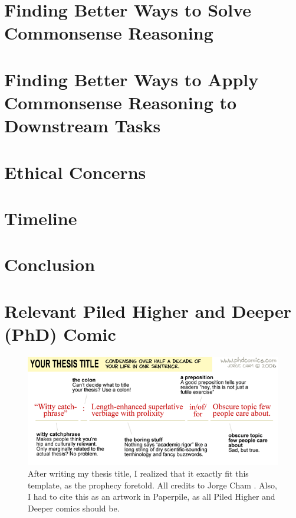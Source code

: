 \documentclass[12pt]{report}
\begin{document}
\newpage
\chapter{Finding Better Ways to Solve Commonsense Reasoning}
\label{chapter:commonsense-reasoning}

\newpage
\chapter{Finding Better Ways to Apply Commonsense Reasoning to Downstream Tasks}

\newpage
\chapter{Ethical Concerns}

\newpage
\chapter{Timeline}


\chapter{Conclusion}

\begin{footnotesize}
    
    
\end{footnotesize}

\appendix

\chapter{Relevant Piled Higher and Deeper (PhD) Comic}

\begin{figure}[h!]
    \includegraphics[width=\textwidth]{phd-comics-718}
    \caption{After writing my thesis title, I realized that it exactly fit this template, as the prophecy foretold. All credits to Jorge Cham \cite{Cham2006-zx}. Also, I had to cite this as an artwork in Paperpile, as all Piled Higher and Deeper comics should be.}
\end{figure}
\end{document}

